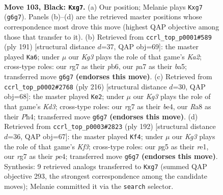 \documentclass[11pt]{article}
\begin{document}
\clearpage

\begin{figure}[p]\centering
\begin{subfigure}{0.46\textwidth}\centering
\resizebox{\linewidth}{!}{%
\newchessgame
\chessboard[
  setfen={r7/P5R1/3n2k1/6P1/8/5BKP/2P5/8 b - - 6 103},
  showmover=false,
  pgfstyle=straightmove, color=movearrow, markmove={g6-g7}
]}
\caption{}
\end{subfigure}\hfill
\begin{subfigure}{0.46\textwidth}\centering
\resizebox{\linewidth}{!}{%
\newchessgame
\chessboard[
  setfen={8/k1P5/1P1K4/B2B4/8/8/8/2r5 b - - 0 96},
  showmover=false,
  pgfstyle=straightmove, color=movearrow, markmove={a7-a6}
]}
\caption{}
\end{subfigure}
\\[4pt]
\begin{subfigure}{0.46\textwidth}\centering
\resizebox{\linewidth}{!}{%
\newchessgame
\chessboard[
  setfen={3R4/8/8/4pk1p/3pb2P/3K4/8/8 w - - 6 109},
  showmover=false,
  pgfstyle=straightmove, color=movearrow, markmove={d3-e2}
]}
\caption{}
\end{subfigure}\hfill
\begin{subfigure}{0.46\textwidth}\centering
\resizebox{\linewidth}{!}{%
\newchessgame
\chessboard[
  setfen={8/8/3Bp1k1/1pR5/4p3/5K2/8/4r3 w - - 0 97},
  showmover=false,
  pgfstyle=straightmove, color=movearrow, markmove={f3-f4}
]}
\caption{}
\end{subfigure}
\caption{\textbf{Move 103, Black: \texttt{Kxg7}.} (a) Our position; Melanie plays \texttt{Kxg7} (\texttt{g6g7}). Panels (b)--(d) are the retrieved master positions whose correspondence most drove this move (highest QAP objective among those that transfer to it). (b) Retrieved from \texttt{ccrl\_top\_p0001\#589} (ply 191) [structural distance $d$=37, QAP obj=69]: the master played \texttt{Ka6}; under $\mu$ our \emph{Kg3} plays the role of that game's \emph{Ka2}; cross-type roles: our \emph{r}g7 as their \emph{p}b6, our \emph{p}a7 as their \emph{b}a5; transferred move \texttt{g6g7} \textbf{(endorses this move)}. (c) Retrieved from \texttt{ccrl\_top\_p0002\#2768} (ply 216) [structural distance $d$=30, QAP obj=68]: the master played \texttt{Ke2}; under $\mu$ our \emph{Kg3} plays the role of that game's \emph{Kd3}; cross-type roles: our \emph{r}g7 as their \emph{b}e4, our \emph{R}a8 as their \emph{P}h4; transferred move \texttt{g6g7} \textbf{(endorses this move)}. (d) Retrieved from \texttt{ccrl\_top\_p0003\#2823} (ply 192) [structural distance $d$=36, QAP obj=67]: the master played \texttt{Kf4}; under $\mu$ our \emph{Kg3} plays the role of that game's \emph{Kf3}; cross-type roles: our \emph{p}g5 as their \emph{r}e1, our \emph{r}g7 as their \emph{p}e4; transferred move \texttt{g6g7} \textbf{(endorses this move)}. Synthesis: 9 retrieved analogs transferred to \texttt{Kxg7} (summed QAP objective 293, the strongest correspondence among the candidate moves); Melanie committed it via the \texttt{search} selector.}
\label{fig:thought-m205}
\end{figure}
\end{document}
